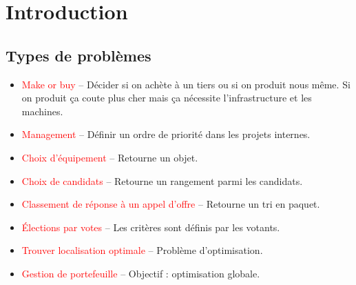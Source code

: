 \documentclass[a4paper, 12pt]{article}
\newcommand{\red}[1]{
	\textcolor{red}{#1}}
\begin{document}
\section{Introduction}
	\subsection{Types de problèmes}
		\begin{itemize}
			\setlength\itemsep{0cm}
			\item \red{Make or buy} -- Décider si on achète à un tiers ou si on produit nous même. Si on produit ça coute plus cher
				mais ça nécessite l'infrastructure et les machines.
			\item \red{Management} -- Définir un ordre de priorité dans les projets internes.
			\item \red{Choix d'équipement} -- Retourne un objet.
			\item \red{Choix de candidats} -- Retourne un rangement parmi les candidats.
			\item \red{Classement de réponse à un appel d'offre} -- Retourne un tri en paquet.
			\item \red{\'Elections par votes} -- Les critères sont définis par les votants.
			\item \red{Trouver localisation optimale} -- Problème d'optimisation.
			\item \red{Gestion de portefeuille} -- Objectif : optimisation globale.
		\end{itemize}
\end{document}
